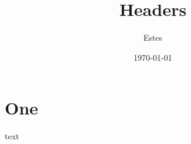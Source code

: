 \documentclass[12pt,a4paper]{report}
\author{Estes}
\date{\today}
\title{Headers}
\begin{document}
\maketitle
\tableofcontents

\part{One}
\label{sec:orgb229db2}
text
\end{document}
